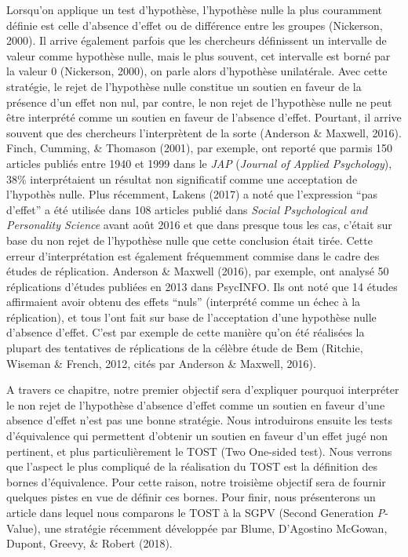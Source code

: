 \documentclass[
  12pt,
  french,
]{article}
\begin{document}
Lorsqu'on applique un test d'hypothèse, l'hypothèse nulle la plus
couramment définie est celle d'absence d'effet ou de différence entre
les groupes (Nickerson, 2000). Il arrive également parfois que les
chercheurs définissent un intervalle de valeur comme hypothèse nulle,
mais le plus souvent, cet intervalle est borné par la valeur 0
(Nickerson, 2000), on parle alors d'hypothèse unilatérale. Avec cette
stratégie, le rejet de l'hypothèse nulle constitue un soutien en faveur
de la présence d'un effet non nul, par contre, le non rejet de
l'hypothèse nulle ne peut être interprété comme un soutien en faveur de
l'absence d'effet. Pourtant, il arrive souvent que des chercheurs
l'interprètent de la sorte (Anderson \& Maxwell, 2016). Finch, Cumming,
\& Thomason (2001), par exemple, ont reporté que parmis 150 articles
publiés entre 1940 et 1999 dans le \emph{JAP} (\emph{Journal of Applied
Psychology}), 38\% interprétaient un résultat non significatif comme une
acceptation de l'hypothès nulle. Plus récemment, Lakens (2017) a noté
que l'expression ``pas d'effet'' a été utilisée dans 108 articles publié
dans \emph{Social Psychological and Personality Science} avant août 2016
et que dans presque tous les cas, c'était sur base du non rejet de
l'hypothèse nulle que cette conclusion était tirée. Cette erreur
d'interprétation est également fréquemment commise dans le cadre des
études de réplication. Anderson \& Maxwell (2016), par exemple, ont
analysé 50 réplications d'études publiées en 2013 dans PsycINFO. Ils ont
noté que 14 études affirmaient avoir obtenu des effets ``nuls''
(interprété comme un échec à la réplication), et tous l'ont fait sur
base de l'acceptation d'une hypothèse nulle d'absence d'effet. C'est par
exemple de cette manière qu'on été réalisées la plupart des tentatives
de réplications de la célèbre étude de Bem (Ritchie, Wiseman \& French,
2012, cités par Anderson \& Maxwell, 2016).

A travers ce chapitre, notre premier objectif sera d'expliquer pourquoi
interpréter le non rejet de l'hypothèse d'absence d'effet comme un
soutien en faveur d'une absence d'effet n'est pas une bonne stratégie.
Nous introduirons ensuite les tests d'équivalence qui permettent
d'obtenir un soutien en faveur d'un effet jugé non pertinent, et plus
particulièrement le TOST (Two One-sided test). Nous verrons que l'aspect
le plus compliqué de la réalisation du TOST est la définition des bornes
d'équivalence. Pour cette raison, notre troisième objectif sera de
fournir quelques pistes en vue de définir ces bornes. Pour finir, nous
présenterons un article dans lequel nous comparons le TOST à la SGPV
(Second Generation \emph{P}-Value), une stratégie récemment développée
par Blume, D'Agostino McGowan, Dupont, Greevy, \& Robert (2018).
\end{document}
